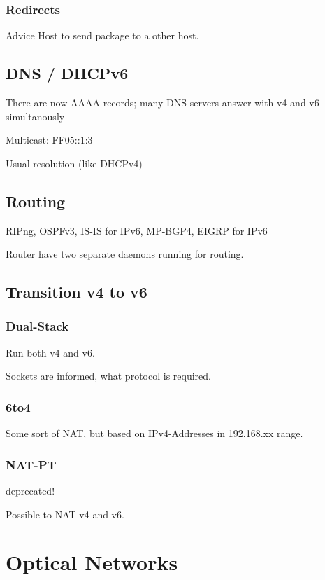 \subsubsection{Redirects}

Advice Host to send package to a other host.

\subsection{DNS / DHCPv6}

There are now AAAA records; many DNS servers answer with v4 and v6 simultanously

Multicast: FF05::1:3

Usual resolution (like DHCPv4)

\subsection{Routing}

RIPng, OSPFv3, IS-IS for IPv6, MP-BGP4, EIGRP for IPv6

Router have two separate daemons running for routing.

\subsection{Transition v4 to v6}

\subsubsection{Dual-Stack}
Run both v4 and v6.

Sockets are informed, what protocol is required.

\subsubsection{6to4}

Some sort of NAT, but based on IPv4-Addresses in 192.168.xx range.

\subsubsection{NAT-PT}

deprecated!

Possible to NAT v4 and v6.

\section{Optical Networks}

